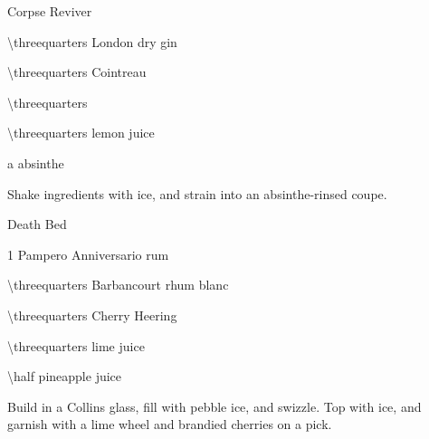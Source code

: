\begin{PDTCocktail}{Corpse Reviver }
	\begin{Ingredients}
	\item \SI{\threequarters}{\oz} London dry gin
	\item \SI{\threequarters}{\oz} Cointreau
	\item \SI{\threequarters}{\oz} \Lillet
	\item \SI{\threequarters}{\oz} lemon juice
	\item a \si{\dash} absinthe
	\end{Ingredients}
	
	\begin{Instructions}
	Shake ingredients with ice, and strain into an absinthe-rinsed coupe.
	\end{Instructions}
\end{PDTCocktail}

%	
%	

\begin{PDTCocktail}{Death Bed}
	\begin{Ingredients}
	\item \SI{1}{\oz} Pampero Anniversario rum
	\item \SI{\threequarters}{\oz} Barbancourt rhum blanc
	\item \SI{\threequarters}{\oz} Cherry Heering
	\item \SI{\threequarters}{\oz} lime juice
	\item \SI{\half}{\oz} pineapple juice
	\end{Ingredients}
	
	\begin{Instructions}
	Build in a Collins glass, fill with pebble ice, and swizzle.  Top with ice, and garnish with a lime wheel and brandied cherries on a pick.
	\end{Instructions}
\end{PDTCocktail}

